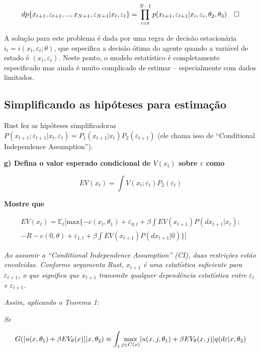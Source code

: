 \documentclass[12pt,a4paper]{article}
\begin{document}
\[
dp\{x_{t+1},\varepsilon_{t+1},...,x_{N+1},\varepsilon_{N+1}|x_t,\varepsilon_t\} \\ = \prod_{i=t}^{N-1}p(x_{t+1},\varepsilon_{t+1}|x_{i},\varepsilon_{i},\theta_2,\theta_3) \quad \square
\]

A solução para este problema é dada por uma regra de decisão
estacionária \(i_t = i(x_t,\varepsilon_t;\theta)\), que especifica a
decisão ótima do agente quando a variável de estado é
\((x_t, \varepsilon_t)\). Neste ponto, o modelo estatístico é
completamente especificado mas ainda é muito complicado de estimar --
especialmente com dados limitados.

\hypertarget{simplificando-as-hipoteses-para-estimacao}{%
\subsection{Simplificando as hipóteses para
estimação}\label{simplificando-as-hipoteses-para-estimacao}}

Rust fez as hipóteses simplificadoras
\(P (x_{t+1}; \varepsilon_{t+1}| x_t, \varepsilon_t) = P_1 ( x_{t+1}| x_t)P_2(\varepsilon_{t+1})\)
(ele chama isso de ``Conditional Independence Assumption'').

\textbf{g) Defina o valor esperado condicional de \(V(x_t)\) sobre
\(\varepsilon\) como}

\textbf{\[EV(x_t)= \int V(x_t;\varepsilon_t)P_2(\varepsilon_t)\]}

\textbf{Mostre que}

\[
\begin{aligned}
EV(x_t)=\mathbb{E}_t[\text{max}\{-c(x_t,\theta_1)+\varepsilon_{0,t} + \beta \int EV(x_{t+1})P(dx_{t+1}|x_t); \\ -R -c(0,\theta) + \varepsilon_{1,t} + \beta \int EV(x_{t+1})P(dx_{t+1}|0)\}]
\end{aligned}
\]

\emph{Ao assumir a ``Conditional Independence Assumption'' (CI), duas
restrições estão envolvidas. Conforme argumenta Rust, \(x_{t+1}\) é uma
estatística suficiente para \(\varepsilon_{t+1}\), o que significa que
\(x_{t+1}\) transmite qualquer dependência estatística entre
\(\varepsilon_{t}\) e \(\varepsilon_{t+1}\).}

\emph{Assim, aplicando o Teorema 1:}

\emph{Se}

\[G([u(x,\theta_1)+\beta EV_\theta(x)]|x,\theta_2) \\ \equiv \int_\varepsilon \max_{j \in C(x)} [u(x,j,\theta_1)+ \beta E V_\theta(x,j)]q(d\varepsilon|x,\theta_2)
\]
\end{document}
